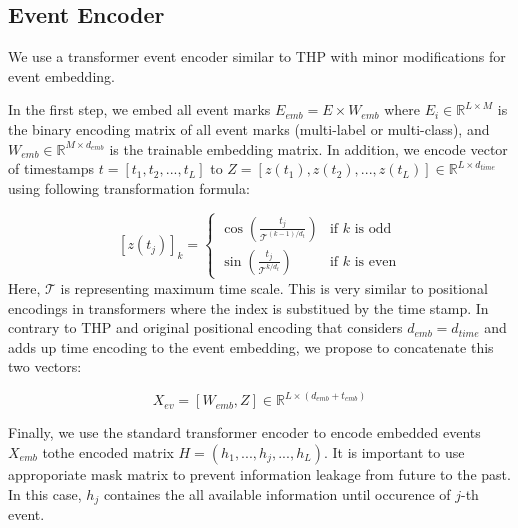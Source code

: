 \documentclass[journal,twoside,web]{ieeecolor}
\begin{document}
\subsection{Event Encoder}
We use a transformer event encoder similar to THP \cite*{zuoTransformerHawkesProcess2020a} with minor modifications for event embedding.

In the first step, we embed all event marks $E_{emb}=E \times W_{emb}$ where $E_i \in \mathbb{R}^{L \times M}$ is the binary encoding matrix of all event marks (multi-label or multi-class), and  $ W_{emb} \in  \mathbb{R}^{M \times d_{emb} }  $ is the trainable embedding matrix. In addition, we encode vector of timestamps $t=[t_1,t_2,...,t_L] $ to $Z=[z(t_1),z(t_2),...,z(t_L)]\in \mathbb{R}^{L \times d_{time}}$ using following transformation formula:

\begin{equation}\label{eq:time-encoding}
    [z(t_j)]_{k} = 
     \begin{cases} 
        \cos\left(  \frac{t_j}{\mathcal{T}^{(k-1)/d_t} }  \right) & \text{if } k \text{ is odd}\\
        \sin\left(  \frac{t_j}{\mathcal{T}^{k/d_t} }  \right) & \text{if } k \text{ is even}

        \end{cases} 
\end{equation} 
Here, $\mathcal{T}$ is representing maximum time scale. This is very similar to positional encodings in transformers where the index is substitued by the time stamp. In contrary to THP and original positional encoding that considers $d_{emb}=d_{time}$ and adds up time encoding to the event embedding, we propose to concatenate this two vectors:

\begin{equation}
    X_{ev}=[W_{emb}, Z] \in \mathbb{R}^{L \times (d_{emb}+t_{emb})}
\end{equation}




Finally, we use the standard transformer encoder to encode embedded events $X_{emb}$ tothe encoded matrix  $ H=(h_1, ..., h_j, ..., h_L) $. It is important to use approporiate mask matrix to prevent information leakage from future to the past. In this case, $h_j$ containes the all available information until occurence of $j$-th event.
\end{document}
